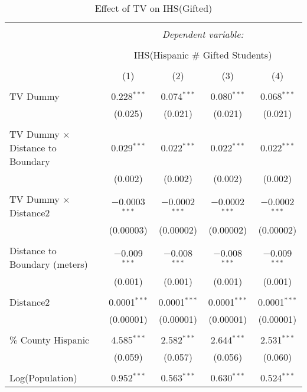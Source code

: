
\begin{table}[!htbp] \centering 
  \caption{Effect of TV on IHS(Gifted)} 
  \label{} 
\begin{tabular}{@{\extracolsep{-2pt}}lcccc} 
\\[-1.8ex]\hline 
\hline \\[-1.8ex] 
 & \multicolumn{4}{c}{\textit{Dependent variable:}} \\ 
\cline{2-5} 
\\[-1.8ex] & \multicolumn{4}{c}{IHS(Hispanic \# Gifted Students)} \\ 
\\[-1.8ex] & (1) & (2) & (3) & (4)\\ 
\hline \\[-1.8ex] 
 TV Dummy & 0.228$^{***}$ & 0.074$^{***}$ & 0.080$^{***}$ & 0.068$^{***}$ \\ 
  & (0.025) & (0.021) & (0.021) & (0.021) \\ 
  & & & & \\ 
 TV Dummy $\times$ Distance to Boundary & 0.029$^{***}$ & 0.022$^{***}$ & 0.022$^{***}$ & 0.022$^{***}$ \\ 
  & (0.002) & (0.002) & (0.002) & (0.002) \\ 
  & & & & \\ 
 TV Dummy $\times$ Distance2 & $-$0.0003$^{***}$ & $-$0.0002$^{***}$ & $-$0.0002$^{***}$ & $-$0.0002$^{***}$ \\ 
  & (0.00003) & (0.00002) & (0.00002) & (0.00002) \\ 
  & & & & \\ 
 Distance to Boundary (meters) & $-$0.009$^{***}$ & $-$0.008$^{***}$ & $-$0.008$^{***}$ & $-$0.009$^{***}$ \\ 
  & (0.001) & (0.001) & (0.001) & (0.001) \\ 
  & & & & \\ 
 Distance2 & 0.0001$^{***}$ & 0.0001$^{***}$ & 0.0001$^{***}$ & 0.0001$^{***}$ \\ 
  & (0.00001) & (0.00001) & (0.00001) & (0.00001) \\ 
  & & & & \\ 
 \% County Hispanic & 4.585$^{***}$ & 2.582$^{***}$ & 2.644$^{***}$ & 2.531$^{***}$ \\ 
  & (0.059) & (0.057) & (0.056) & (0.060) \\ 
  & & & & \\ 
 Log(Population) & 0.952$^{***}$ & 0.563$^{***}$ & 0.630$^{***}$ & 0.524$^{***}$ \\ 

\end{tabular}
\end{table}
